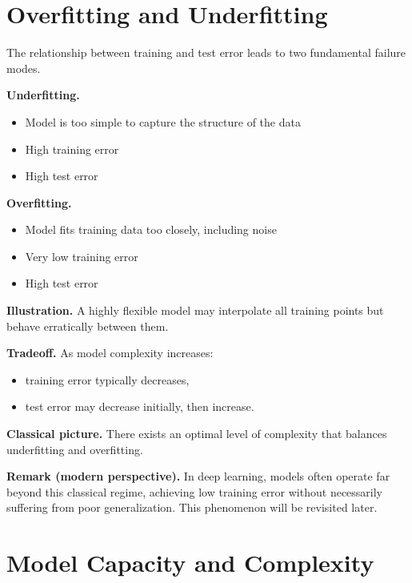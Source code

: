 \section{Overfitting and Underfitting}

The relationship between training and test error leads to two fundamental failure modes.

\medskip

\noindent
\textbf{Underfitting.}
\begin{itemize}
    \item Model is too simple to capture the structure of the data
    \item High training error
    \item High test error
\end{itemize}

\medskip

\noindent
\textbf{Overfitting.}
\begin{itemize}
    \item Model fits training data too closely, including noise
    \item Very low training error
    \item High test error
\end{itemize}

\medskip

\noindent
\textbf{Illustration.}  
A highly flexible model may interpolate all training points but behave erratically between them.

\medskip

\noindent
\textbf{Tradeoff.}  
As model complexity increases:
\begin{itemize}
    \item training error typically decreases,
    \item test error may decrease initially, then increase.
\end{itemize}

\medskip

\noindent
\textbf{Classical picture.}  
There exists an optimal level of complexity that balances underfitting and overfitting.

\medskip

\noindent
\textbf{Remark (modern perspective).}  
In deep learning, models often operate far beyond this classical regime, achieving low training error without necessarily suffering from poor generalization. This phenomenon will be revisited later.

\section{Model Capacity and Complexity}

